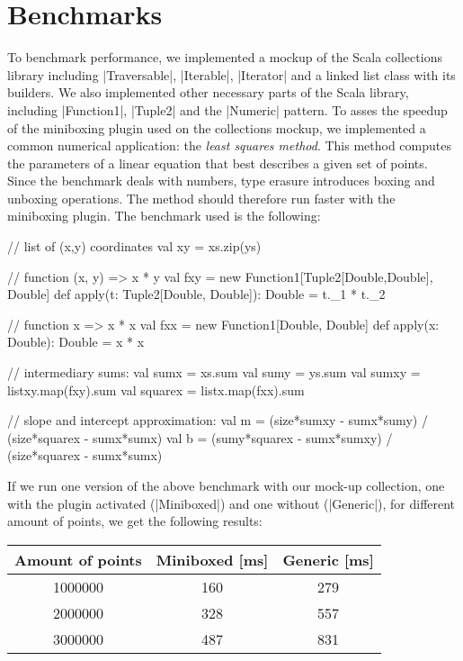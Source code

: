\section{Benchmarks}

To benchmark performance, we implemented a mockup of the Scala collections library including |Traversable|, |Iterable|, |Iterator| and a linked list class with its builders. We also implemented other necessary parts of the Scala library, including |Function1|, |Tuple2| and the |Numeric| pattern. To asses the speedup of the miniboxing plugin used on the collections mockup, we implemented a common numerical application: the \textit{least squares method}. This method computes the parameters of a linear equation that best describes a given set of points. Since the benchmark deals with numbers, type erasure introduces boxing and unboxing operations. The method should therefore run faster with the miniboxing plugin. The benchmark used is the following:

\begin{lstlisting-nobreak}
 // list of (x,y) coordinates
 val xy = xs.zip(ys)

 // function (x, y) => x * y
 val fxy =
   new Function1[Tuple2[Double,Double], Double] {
     def apply(t: Tuple2[Double, Double]): Double = t._1 * t._2 }

 // function x => x * x
 val fxx =
   new Function1[Double, Double] {
     def apply(x: Double): Double = x * x }

 // intermediary sums:
 val sumx  = xs.sum
 val sumy  = ys.sum
 val sumxy = listxy.map(fxy).sum
 val squarex = listx.map(fxx).sum

 // slope and intercept approximation:
 val m = (size*sumxy - sumx*sumy) / (size*squarex - sumx*sumx)
 val b = (sumy*squarex - sumx*sumxy) / (size*squarex - sumx*sumx)
\end{lstlisting-nobreak}
%

If we run one version of the above benchmark with our mock-up collection, one with the plugin activated (|Miniboxed|) and one without (|Generic|), for different amount of points, we get the following results:

\begin{center}
\begin{tabular}{ |c|c|c| }
 \hline
 Amount of points & Miniboxed [ms] & Generic [ms] \\
 \hline
1000000 &  160 &  279 \\
2000000 &  328 &  557 \\
3000000 &  487 &  831 \\
 \hline
\end{tabular}
\end{center}

